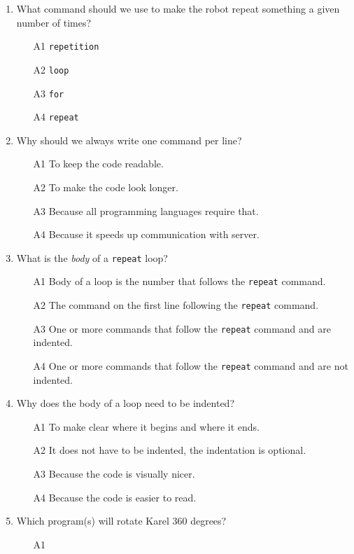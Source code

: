 \begin{enumerate}
\item What command should we use to make the robot repeat something a given number of times?
\begin{enumerate}
\item[A1] {\tt repetition}
\item[A2] {\tt loop}
\item[A3] {\tt for}
\item[A4] {\tt repeat}
\end{enumerate}
\item Why should we always write one command per line?
\begin{enumerate}
\item[A1] To keep the code readable.
\item[A2] To make the code look longer.
\item[A3] Because all programming languages require that.
\item[A4] Because it speeds up communication with server.
\end{enumerate}
\item What is the {\em body} of a {\tt repeat} loop?
\begin{enumerate}
\item[A1] Body of a loop is the number that follows the {\tt repeat} command. 
\item[A2] The command on the first line following the {\tt repeat} command.
\item[A3] One or more commands that follow the {\tt repeat} command and are indented.
\item[A4] One or more commands that follow the {\tt repeat} command and are not indented.
\end{enumerate}
\item Why does the body of a loop need to be indented?
\begin{enumerate}
\item[A1] To make clear where it begins and where it ends.
\item[A2] It does not have to be indented, the indentation is optional.
\item[A3] Because the code is visually nicer.
\item[A4] Because the code is easier to read.
\end{enumerate}
\item Which program(s) will rotate Karel 360 degrees?
\begin{enumerate}
\item[A1] 

\end{enumerate}
\end{enumerate}
